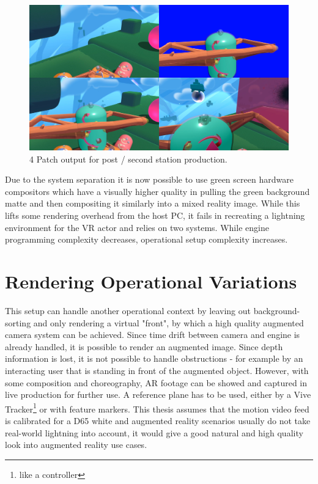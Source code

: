\begin{figure}[htb]
	\includegraphics[width=\textwidth]{_external/media/4patch.jpg}
	\caption{4 Patch output for post / second station 
	production\cite{gartner:mixed-reality:2017}.}
	\label{fig:alt-render:4patch}
\end{figure}

Due to the system separation it is now possible to use green screen hardware 
compositors which have a visually higher quality in pulling the green 
background matte and then compositing it similarly into a mixed reality image. 
While this lifts some rendering overhead from the host PC, it fails in 
recreating a lightning environment for the VR actor and relies on two systems. 
While engine programming complexity decreases, operational setup complexity 
increases.

\section{Rendering Operational Variations}

This setup can handle another operational context by leaving out 
background-sorting and only rendering a virtual "front", by which a high 
quality augmented camera system can be achieved. Since time drift between 
camera and engine is already handled, it is possible to render an augmented 
image. Since depth information is lost, it is not possible to handle 
obstructions - for example by an interacting user that is standing in front of 
the augmented object. However, with some composition and choreography, AR 
footage can be showed and captured in live production for further use. A 
reference plane has to be used, either by a Vive Tracker\footnote{like a 
controller} or with feature markers.
\newline
This thesis assumes that the motion video feed is calibrated for a D65 white 
and augmented reality scenarios usually do not take real-world lightning into 
account, it would give a good natural and high quality look into augmented 
reality use cases.

